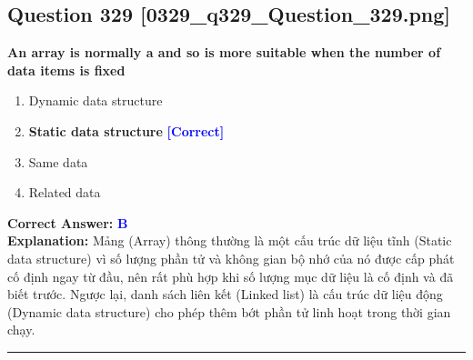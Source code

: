 \documentclass[11pt,a4paper]{article}
\begin{document}
\begin{minipage}{\textwidth}
\subsection*{Question 329 \quad \footnotesize{[0329\_q329\_Question\_329.png]}}
\noindent \textbf{An array is normally a and so is more suitable when the number of data items is fixed}

\begin{enumerate}[label=\Alph*.]
    \item Dynamic data structure
    \item \textbf{Static data structure} \hfill \textcolor{blue}{\textbf{[Correct]}}
    \item Same data
    \item Related data
\end{enumerate}

\noindent \textbf{Correct Answer:} \textcolor{blue}{\textbf{B}} \\[2pt]
\noindent \textbf{Explanation:} Mảng (Array) thông thường là một cấu trúc dữ liệu tĩnh (Static data structure) vì số lượng phần tử và không gian bộ nhớ của nó được cấp phát cố định ngay từ đầu, nên rất phù hợp khi số lượng mục dữ liệu là cố định và đã biết trước. Ngược lại, danh sách liên kết (Linked list) là cấu trúc dữ liệu động (Dynamic data structure) cho phép thêm bớt phần tử linh hoạt trong thời gian chạy.

\par\vspace{0.3cm}
\hrule
\vspace{0.3cm}
\end{minipage}
\end{document}
